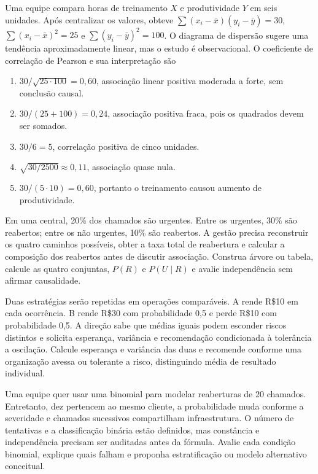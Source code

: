 \TextoBase Uma equipe compara horas de treinamento $X$ e produtividade $Y$ em seis unidades. Após centralizar os valores, obteve $\sum (x_i-\bar{x})(y_i-\bar{y})=30$, $\sum(x_i-\bar{x})^2=25$ e $\sum(y_i-\bar{y})^2=100$. O diagrama de dispersão sugere uma tendência aproximadamente linear, mas o estudo é observacional.
\FonteDidatica
\Comando O coeficiente de correlação de Pearson e sua interpretação são
\begin{enumerate}[label=\Alph*)]
\item $30/\sqrt{25\cdot100}=0{,}60$, associação linear positiva moderada a forte, sem conclusão causal.
\item $30/(25+100)=0{,}24$, associação positiva fraca, pois os quadrados devem ser somados.
\item $30/6=5$, correlação positiva de cinco unidades.
\item $\sqrt{30/2500}\approx0{,}11$, associação quase nula.
\item $30/(5\cdot10)=0{,}60$, portanto o treinamento causou aumento de produtividade.
\end{enumerate}
\TextoBase Em uma central, 20\% dos chamados são urgentes. Entre os urgentes, 30\% são reabertos; entre os não urgentes, 10\% são reabertos. A gestão precisa reconstruir os quatro caminhos possíveis, obter a taxa total de reabertura e calcular a composição dos reabertos antes de discutir associação.
\FonteDidatica
\Comando Construa árvore ou tabela, calcule as quatro conjuntas, $P(R)$ e $P(U\mid R)$ e avalie independência sem afirmar causalidade.

\TextoBase Duas estratégias serão repetidas em operações comparáveis. A rende R\$10 em cada ocorrência. B rende R\$30 com probabilidade 0,5 e perde R\$10 com probabilidade 0,5. A direção sabe que médias iguais podem esconder riscos distintos e solicita esperança, variância e recomendação condicionada à tolerância a oscilação.
\FonteDidatica
\Comando Calcule esperança e variância das duas e recomende conforme uma organização avessa ou tolerante a risco, distinguindo média de resultado individual.

\TextoBase Uma equipe quer usar uma binomial para modelar reaberturas de 20 chamados. Entretanto, dez pertencem ao mesmo cliente, a probabilidade muda conforme a severidade e chamados sucessivos compartilham infraestrutura. O número de tentativas e a classificação binária estão definidos, mas constância e independência precisam ser auditadas antes da fórmula.
\FonteDidatica
\Comando Avalie cada condição binomial, explique quais falham e proponha estratificação ou modelo alternativo conceitual.

